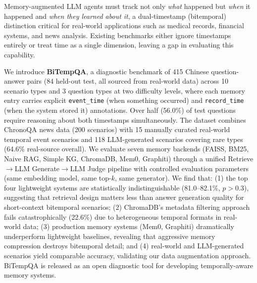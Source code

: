 Memory-augmented LLM agents must track not only \emph{what} happened but \emph{when} it happened and \emph{when they learned about it}, a dual-timestamp (bitemporal) distinction critical for real-world applications such as medical records, financial systems, and news analysis.
Existing benchmarks either ignore timestamps entirely or treat time as a single dimension, leaving a gap in evaluating this capability.

We introduce \textbf{BiTempQA}, a diagnostic benchmark of 415 Chinese question-answer pairs (84 held-out test, all sourced from real-world data) across 10 scenario types and 3 question types at two difficulty levels, where each memory entry carries explicit \texttt{event\_time} (when something occurred) and \texttt{record\_time} (when the system stored it) annotations.
Over half (56.0\%) of test questions require reasoning about both timestamps simultaneously.
The dataset combines ChronoQA news data (200 scenarios) with 15 manually curated real-world temporal event scenarios and 118 LLM-generated scenarios covering rare types (64.6\% real-source overall).
We evaluate seven memory backends (FAISS, BM25, Naive RAG, Simple KG, ChromaDB, Mem0, Graphiti) through a unified Retrieve$\to$LLM Generate$\to$LLM Judge pipeline with controlled evaluation parameters (same embedding model, same top-$k$, same generator).
We find that: (1) the top four lightweight systems are statistically indistinguishable (81.0--82.1\%, $p{>}0.3$), suggesting that retrieval design matters less than answer generation quality for short-context bitemporal scenarios; (2) ChromaDB's metadata filtering approach fails catastrophically (22.6\%) due to heterogeneous temporal formats in real-world data; (3) production memory systems (Mem0, Graphiti) dramatically underperform lightweight baselines, revealing that aggressive memory compression destroys bitemporal detail; and (4) real-world and LLM-generated scenarios yield comparable accuracy, validating our data augmentation approach.
BiTempQA is released as an open diagnostic tool for developing temporally-aware memory systems.

